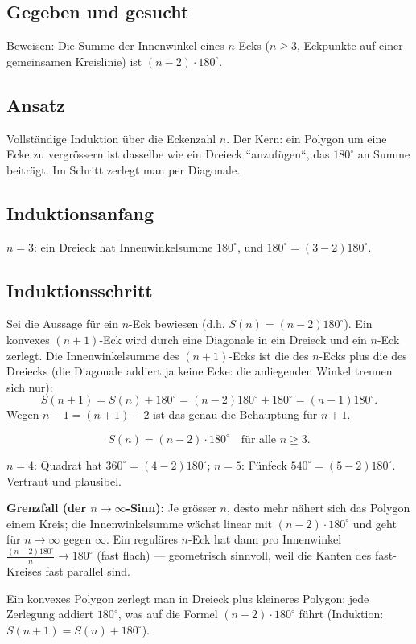 

\subsection*{Gegeben und gesucht}
Beweisen: Die Summe der Innenwinkel eines $n$-Ecks ($n\ge3$, Eckpunkte
auf einer gemeinsamen Kreislinie) ist $(n-2)\cdot180^\circ$.

\subsection*{Ansatz}
Vollständige Induktion über die Eckenzahl $n$. Der Kern: ein Polygon um
eine Ecke zu vergrössern ist dasselbe wie ein Dreieck ``anzufügen``,
das $180^\circ$ an Summe beiträgt. Im Schritt zerlegt man per Diagonale.

\subsection*{Induktionsanfang}
$n=3$: ein Dreieck hat Innenwinkelsumme $180^\circ$, und
$180^\circ=(3-2)180^\circ$. \checkmark

\subsection*{Induktionsschritt}
Sei die Aussage für ein $n$-Eck bewiesen (d.h. $S(n)=(n-2)180^\circ$).
Ein konvexes $(n+1)$-Eck wird durch eine Diagonale in ein Dreieck und ein
$n$-Eck zerlegt. Die Innenwinkelsumme des $(n+1)$-Ecks ist die des
$n$-Ecks plus die des Dreiecks (die Diagonale addiert ja keine Ecke:
die anliegenden Winkel trennen sich nur):
\begin{equation}
  S(n+1)=S(n)+180^\circ=(n-2)180^\circ+180^\circ=(n-1)180^\circ .
\end{equation}
Wegen $n-1=(n+1)-2$ ist das genau die Behauptung für $n+1$. \checkmark

\begin{ergebnis}
\begin{equation*}
  S(n)=(n-2)\cdot180^\circ\quad\text{für alle } n\ge3 .
\end{equation*}
\end{ergebnis}

\begin{kontrolle}
$n=4$: Quadrat hat $360^\circ=(4-2)180^\circ$; $n=5$: Fünfeck
$540^\circ=(5-2)180^\circ$. Vertraut und plausibel.

\textbf{Grenzfall (der $n\to\infty$-Sinn):} Je grösser $n$, desto mehr
nähert sich das Polygon einem Kreis; die Innenwinkelsumme wächst linear
mit $(n-2)\cdot180^\circ$ und geht für $n\to\infty$ gegen $\infty$.
Ein reguläres $n$-Eck hat dann pro Innenwinkel
$\frac{(n-2)180^\circ}{n}\to180^\circ$ (fast flach) --- geometrisch
sinnvoll, weil die Kanten des fast-Kreises fast parallel sind.
\end{kontrolle}

\begin{merksatz}
Ein konvexes Polygon zerlegt man in Dreieck plus kleineres Polygon; jede
Zerlegung addiert $180^\circ$, was auf die Formel $(n-2)\cdot180^\circ$
führt (Induktion: $S(n+1)=S(n)+180^\circ$).
\end{merksatz}
